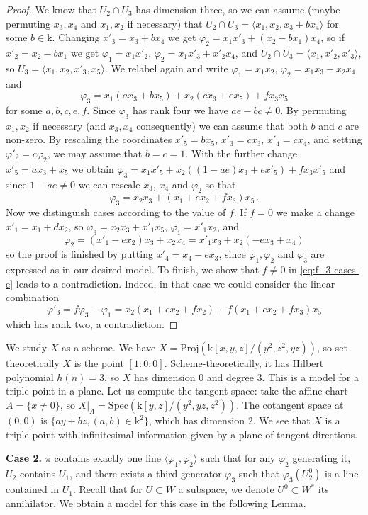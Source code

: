 \documentclass[10pt,reqno]{amsart}
\newcommand{\f}{\varphi}
\newcommand{\kk}{\mathrm{k}}
\theoremstyle{definition}
\begin{document}
\begin{proof}
\item We know that $U_2\cap U_3$ has dimension three, so we can assume (maybe permuting $x_3,x_4$ and $x_1,x_2$ if necessary) that $U_2 \cap U_3=\langle x_1,x_2,x_3+bx_4\rangle$ for some $b\in\kk$. Changing $x'_3=x_3+bx_4$ we get $\f_2=x_1x'_3+(x_2-bx_1)x_4$, so if $x'_2=x_2-bx_1$ we get $\f_1=x_1x'_2$, $\f_2=x_1x'_3+x'_2x_4$, and $U_2\cap U_3=\langle x_1,x'_2,x'_3\rangle$, so $U_3=\langle x_1,x_2,x'_3,x_5\rangle$. We relabel again and write $\f_1=x_1x_2$, $\f_2=x_1x_3+x_2x_4$ and
\[
\f_3=x_1(ax_3+bx_5)+x_2(cx_3+ex_5)+fx_3x_5
\]
for some $a,b,c,e,f$. Since $\f_3$ has rank four we have $ae-bc \ne 0$. By permuting $x_1,x_2$ if necessary (and $x_3,x_4$ consequently) we can assume that both $b$ and $c$ are non-zero. By rescaling the coordinates $x'_5=bx_5$, $x'_3=cx_3$, $x'_4=cx_4$, and setting $\f'_2=c\f_2$, we may assume that $b=c=1$. With the further change $x'_5=ax_3+x_5$ we obtain $\f_3=x_1x'_5+x_2((1-ae)x_3+ex'_5)+fx_3x'_5$ and since $1-ae \ne 0$ we can rescale $x_3$, $x_4$ and $\f_2$ so that
\begin{equation} \label{eq:f_3-cases-e}
    \f_3=x_2x_3+(x_1+ex_2+fx_3)x_5 \, .
\end{equation}
Now we distinguish cases according to the value of $f$. If $f=0$ we make a change $x'_1=x_1+dx_2$, so $\f_3=x_2x_3+x'_1x_5$, $\f_1=x'_1x_2$, and 
\[
\f_2=(x'_1-ex_2)x_3+x_2x_4=x'_1x_3+x_2(-ex_3+x_4)
\]
so the proof is finished by putting $x'_4=x_4-ex_3$, since $\f_1, \f_2$ and $\f_3$ are expressed as in our desired model. To finish, we show that $f \ne 0$ in \eqref{eq:f_3-cases-e} leads to a contradiction. Indeed, in that case we could consider the linear combination
\[
\f'_3=f\f_3-\f_1= x_2(x_1+ex_2+fx_2)+f(x_1+ex_2+fx_3)x_5
\]
which has rank two, a contradiction.
\end{proof}

\noindent We study $X$ as a scheme. We have $X=\mathrm{Proj}(\kk[x,y,z]/(y^2,z^2,yz))$, so set-theoretically $X$ is the point $[1:0:0]$. Scheme-theoretically, it has Hilbert polynomial $h(n)=3$, so $X$ has dimension $0$ and degree $3$. This is a model for a triple point in a plane. Let us compute the tangent space: take the affine chart $A=\{x \ne 0\}$, so $X|_A=\mathrm{Spec}\left(\kk[y,z]/(y^2,yz,z^2)\right)$. The cotangent space at $(0,0)$ is $\{a y + b z, (a,b) \in \kk^2\}$, which has dimension $2$. We see that $X$ is a triple point with infinitesimal information given by a plane of tangent directions.

\noindent \textbf{Case 2.} $\pi$ contains exactly one line $\langle \f_1, \f_2\rangle$ such that for any $\f_2$ generating it, $U_2$ contains $U_1$, and there exists a third generator $\f_3$ such that $\f_3\left(U_2^0\right)$ is a line contained in $U_1$. Recall that for $U \subset W$ a subspace, we denote $U^0 \subset W^*$ its annihilator. We obtain a model for this case in the following Lemma. 
\end{document}
